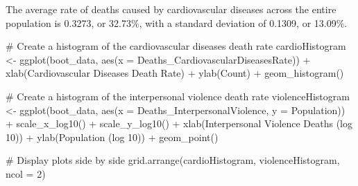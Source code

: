 \documentclass[
  letterpaper,
  DIV=11,
  numbers=noendperiod]{scrartcl}
\newenvironment{Shaded}{\begin{snugshade}}{\end{snugshade}}
\newcommand{\AttributeTok}[1]{\textcolor[rgb]{0.40,0.45,0.13}{#1}}
\newcommand{\CommentTok}[1]{\textcolor[rgb]{0.37,0.37,0.37}{#1}}
\newcommand{\DecValTok}[1]{\textcolor[rgb]{0.68,0.00,0.00}{#1}}
\newcommand{\FunctionTok}[1]{\textcolor[rgb]{0.28,0.35,0.67}{#1}}
\newcommand{\NormalTok}[1]{\textcolor[rgb]{0.00,0.23,0.31}{#1}}
\newcommand{\OtherTok}[1]{\textcolor[rgb]{0.00,0.23,0.31}{#1}}
\newcommand{\SpecialCharTok}[1]{\textcolor[rgb]{0.37,0.37,0.37}{#1}}
\newcommand{\StringTok}[1]{\textcolor[rgb]{0.13,0.47,0.30}{#1}}
\begin{document}
The average rate of deaths caused by cardiovascular diseases across the
entire population is 0.3273, or 32.73\%, with a standard deviation of
0.1309, or 13.09\%.

\begin{Shaded}
\begin{Highlighting}[]
\CommentTok{\# Create a histogram of the cardiovascular diseases death rate}
\NormalTok{cardioHistogram }\OtherTok{\textless{}{-}} \FunctionTok{ggplot}\NormalTok{(boot\_data, }
                          \FunctionTok{aes}\NormalTok{(}\AttributeTok{x =}\NormalTok{ Deaths\_CardiovascularDiseasesRate)) }\SpecialCharTok{+}
                   \FunctionTok{xlab}\NormalTok{(}\StringTok{\textquotesingle{}Cardiovascular Diseases Death Rate\textquotesingle{}}\NormalTok{) }\SpecialCharTok{+}
                   \FunctionTok{ylab}\NormalTok{(}\StringTok{\textquotesingle{}Count\textquotesingle{}}\NormalTok{) }\SpecialCharTok{+}
                   \FunctionTok{geom\_histogram}\NormalTok{()}

\CommentTok{\# Create a histogram of the interpersonal violence death rate}
\NormalTok{violenceHistogram }\OtherTok{\textless{}{-}} \FunctionTok{ggplot}\NormalTok{(boot\_data, }
                            \FunctionTok{aes}\NormalTok{(}\AttributeTok{x =}\NormalTok{ Deaths\_InterpersonalViolence, }
                                \AttributeTok{y =}\NormalTok{ Population)) }\SpecialCharTok{+}
                     \FunctionTok{scale\_x\_log10}\NormalTok{() }\SpecialCharTok{+}
                     \FunctionTok{scale\_y\_log10}\NormalTok{() }\SpecialCharTok{+}
                     \FunctionTok{xlab}\NormalTok{(}\StringTok{\textquotesingle{}Interpersonal Violence Deaths (log 10)\textquotesingle{}}\NormalTok{) }\SpecialCharTok{+}
                     \FunctionTok{ylab}\NormalTok{(}\StringTok{\textquotesingle{}Population (log 10)\textquotesingle{}}\NormalTok{) }\SpecialCharTok{+}
                     \FunctionTok{geom\_point}\NormalTok{() }

\CommentTok{\# Display plots side by side}
\FunctionTok{grid.arrange}\NormalTok{(cardioHistogram, violenceHistogram, }\AttributeTok{ncol =} \DecValTok{2}\NormalTok{)}
\end{Highlighting}
\end{Shaded}
\end{document}
